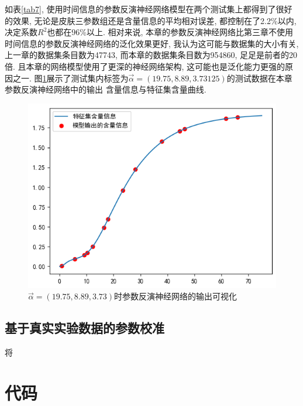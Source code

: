 \documentclass[a4paper,punct=banjiao,twoside]{ctexrep}
\theoremstyle{plain}
\theoremstyle{definition}
\theoremstyle{remark}
\begin{document}
如表\ref{tab7}, 使用时间信息的参数反演神经网络模型在两个测试集上都得到了很好的效果, 无论是皮肤三参数组还是含量信息的平均相对误差, 都控制在了2.2\%以内, 决定系数$R^2$也都在96\%以上. 相对来说, 本章的参数反演神经网络比第三章不使用时间信息的参数反演神经网络的泛化效果更好, 我认为这可能与数据集的大小有关, 上一章的数据集条目数为47743, 而本章的数据集条目数为954860, 足足是前者的20倍. 且本章的网络模型使用了更深的神经网络架构, 这可能也是泛化能力更强的原因之一.
图\ref{时间网络反演}展示了测试集内标签为$\vec{\alpha}=(19.75,8.89,3.73125)$的测试数据在本章参数反演神经网络中的输出
含量信息与特征集含量曲线.
\begin{figure}[H]
  \centering
  \includegraphics[scale=0.6]{./figs/p7.png}
  \caption{$\vec{\alpha}=(19.75,8.89,3.73)$时参数反演神经网络的输出可视化}
  \label{时间网络反演}
\end{figure}

\section{基于真实实验数据\cite{11}的参数校准}

将











\clearpage
\mbox{}
\thispagestyle{empty}

\appendix
\chapter{代码}
\end{document}
